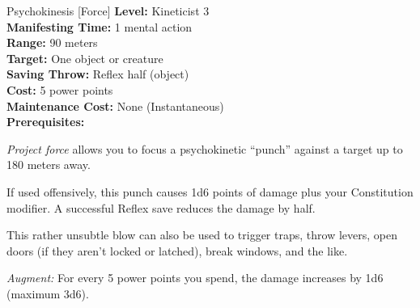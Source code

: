{Psychokinesis [Force]}
{
	\textbf{Level:}
	Kineticist 3\\
	\textbf{Manifesting Time:}
	1 mental action\\
	\textbf{Range:}
	90 meters\\
	\textbf{Target:}
	One object or creature\\
	\textbf{Saving Throw:}
	Reflex half (object)\\
	\textbf{Cost:}
	5 power points\\
	\textbf{Maintenance Cost:}
	None (Instantaneous)\\
	\textbf{Prerequisites:}
	\\
}
{
	\emph{Project force} allows you to focus a psychokinetic ``punch'' against a target up to 180 meters away.

	If used offensively, this punch causes 1d6 points of damage plus your Constitution modifier. A successful Reflex save reduces the damage by half.

	This rather unsubtle blow can also be used to trigger traps, throw levers, open doors (if they aren't locked or latched), break windows, and the like.

	\textit{Augment:} For every 5 power points you spend, the damage increases by 1d6 (maximum 3d6).
}